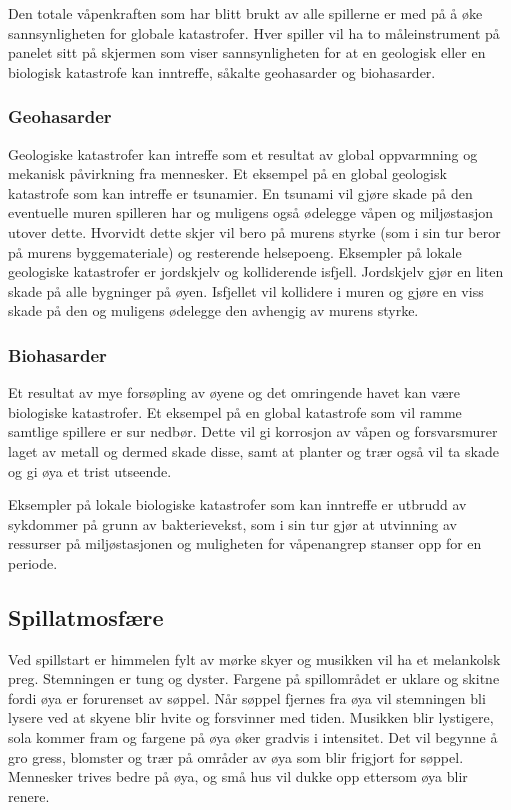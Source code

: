 Den totale våpenkraften som har blitt brukt av alle spillerne er med på å øke sannsynligheten for globale katastrofer. Hver spiller vil ha to måleinstrument på panelet sitt på skjermen som viser sannsynligheten for at en geologisk eller en biologisk katastrofe kan inntreffe, såkalte geohasarder og biohasarder.


\subsubsection{Geohasarder}
Geologiske katastrofer kan intreffe som et resultat av global oppvarmning og mekanisk påvirkning fra mennesker.
Et eksempel på en global geologisk katastrofe som kan intreffe er tsunamier. En tsunami vil gjøre skade på den eventuelle muren spilleren har og muligens også ødelegge våpen og miljøstasjon utover dette. Hvorvidt dette skjer vil bero på murens styrke (som i sin tur beror på murens byggemateriale) og resterende helsepoeng. Eksempler på lokale geologiske katastrofer er jordskjelv og kolliderende isfjell. Jordskjelv gjør en liten skade på alle bygninger på øyen. Isfjellet vil kollidere i muren og gjøre en viss skade på den og muligens ødelegge den avhengig av murens styrke. 


\subsubsection{Biohasarder}
Et resultat av mye forsøpling av øyene og det omringende havet kan være biologiske katastrofer.
Et eksempel på en global katastrofe som vil ramme samtlige spillere er sur nedbør. Dette vil gi korrosjon av våpen og forsvarsmurer laget av metall og dermed skade disse, samt at planter og trær også vil ta skade og gi øya et trist utseende.

Eksempler på lokale biologiske katastrofer som kan inntreffe er utbrudd av sykdommer på grunn av bakterievekst, som i sin tur gjør at utvinning av ressurser på miljøstasjonen og muligheten for våpenangrep stanser opp for en periode.


\subsection{Spillatmosfære}

Ved spillstart er himmelen fylt av mørke skyer og musikken vil ha et melankolsk preg. Stemningen er tung og dyster. Fargene på spillområdet er uklare og skitne fordi øya er forurenset av søppel.
Når søppel fjernes fra øya vil stemningen bli lysere ved at skyene blir hvite og forsvinner med tiden. Musikken blir lystigere, sola kommer fram og fargene på øya øker gradvis i intensitet. Det vil begynne å gro gress, blomster og 
trær på områder av øya som blir frigjort for søppel. Mennesker trives bedre på øya, og små hus vil dukke opp ettersom øya blir renere. 

